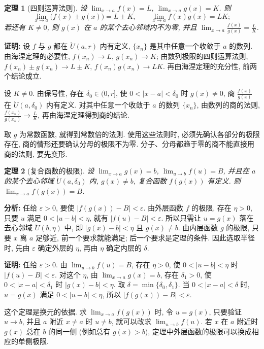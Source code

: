 \documentclass[UTF8,openany]{ctexbook}
\theoremstyle{chinesetextbook}
\newtheorem{theorem}{定理}[section]
\newenvironment{cnproof}{\par\indent\textbf{证明:} \ignorespaces}{\par}
\begin{document}
\begin{theorem}[四则运算法则]
设 $\displaystyle\lim_{x\to a}f(x)=L$, $\displaystyle\lim_{x\to a}g(x)=K$. 则
\[
\lim_{x\to a}\bigl(f(x)\pm g(x)\bigr)=L\pm K,\qquad\lim_{x\to a}f(x)g(x)=LK;
\]
若还有 $K\ne0$, 则 $g(x)$ 在 $a$ 的某个去心邻域内不为零, 并且 $\displaystyle\lim_{x\to a}\frac{f(x)}{g(x)}=\frac LK$.
\end{theorem}
\begin{cnproof}
设 $f$ 与 $g$ 都在 $\mathring U(a,r)$ 内有定义, $\{x_n\}$ 是其中任意一个收敛于 $a$ 的数列. 由海涅定理的必要性, $f(x_n)\to L$, $g(x_n)\to K$; 由数列极限的四则运算法则, $f(x_n)\pm g(x_n)\to L\pm K$, $f(x_n)g(x_n)\to LK$. 再由海涅定理的充分性, 前两个结论成立.

设 $K\ne0$. 由保号性, 存在 $\delta_0\in(0,r]$, 使 $0<|x-a|<\delta_0$ 时 $g(x)\ne0$, 商 $\displaystyle\frac{f(x)}{g(x)}$ 在 $\mathring U(a,\delta_0)$ 内有定义. 对其中任意一个收敛于 $a$ 的数列 $\{x_n\}$, 由数列的商的法则, $\displaystyle\frac{f(x_n)}{g(x_n)}\to\frac LK$, 再由海涅定理得到商的结论.
\end{cnproof}
取 $g$ 为常数函数, 就得到常数倍的法则. 使用这些法则时, 必须先确认各部分的极限存在, 商的情形还要确认分母的极限不为零. 分子、分母都趋于零的商不能直接用商的法则, 要先变形.
\begin{theorem}[复合函数的极限]
设 $\displaystyle\lim_{x\to a}g(x)=b$, $\displaystyle\lim_{u\to b}f(u)=B$, 并且在 $a$ 的某个去心邻域 $\mathring U(a,\delta_0)$ 内, $g(x)\ne b$, 复合函数 $f(g(x))$ 有定义. 则 $\displaystyle\lim_{x\to a}f(g(x))=B$.
\end{theorem}
\par\indent\textbf{分析:} 任给 $\varepsilon>0$, 要使 $|f(g(x))-B|<\varepsilon$. 由外层函数 $f$ 的极限, 存在 $\eta>0$, 只要 $u$ 满足 $0<|u-b|<\eta$, 就有 $|f(u)-B|<\varepsilon$. 所以只需让 $u=g(x)$ 落在去心邻域 $\mathring U(b,\eta)$ 中, 即 $|g(x)-b|<\eta$ 且 $g(x)\ne b$. 由内层函数 $g$ 的极限, 只要 $x$ 离 $a$ 足够近, 前一个要求就能满足; 后一个要求是定理的条件. 因此选取半径时, 先由 $\varepsilon$ 确定外层的 $\eta$, 再由 $\eta$ 确定内层的 $\delta$.
\begin{cnproof}
任给 $\varepsilon>0$. 由 $\displaystyle\lim_{u\to b}f(u)=B$, 存在 $\eta>0$, 使 $0<|u-b|<\eta$ 时 $|f(u)-B|<\varepsilon$. 对这个 $\eta$, 由 $\displaystyle\lim_{x\to a}g(x)=b$, 存在 $\delta_1>0$, 使 $0<|x-a|<\delta_1$ 时 $|g(x)-b|<\eta$. 取 $\delta=\min\{\delta_0,\delta_1\}$. 当 $0<|x-a|<\delta$ 时, $u=g(x)$ 满足 $0<|u-b|<\eta$, 所以 $|f(g(x))-B|<\varepsilon$.
\end{cnproof}
这个定理是换元的依据. 求 $\displaystyle\lim_{x\to a}f(g(x))$ 时, 令 $u=g(x)$, 只要验证 $u\to b$, 并且 $a$ 附近 $x\ne a$ 时 $u\ne b$, 就可以改求 $\displaystyle\lim_{u\to b}f(u)$. 若 $x$ 在 $a$ 附近时 $g(x)$ 总在 $b$ 的同一侧 (例如总有 $g(x)>b$), 定理中外层函数的极限可以换成相应的单侧极限.
\end{document}
